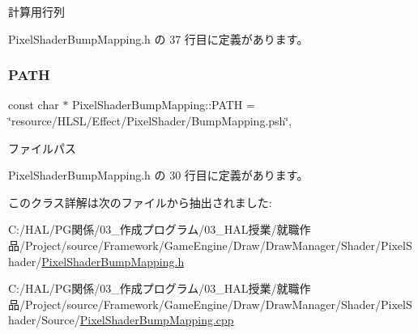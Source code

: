 計算用行列 



 Pixel\+Shader\+Bump\+Mapping.\+h の 37 行目に定義があります。

\mbox{\label{class_pixel_shader_bump_mapping_a62c06006cdfad9bc6158b5d779aa732c}} 
\subsubsection{\texorpdfstring{P\+A\+TH}{PATH}}
{\footnotesize\ttfamily const char $\ast$ Pixel\+Shader\+Bump\+Mapping\+::\+P\+A\+TH = \char`\"{}resource/H\+L\+SL/Effect/Pixel\+Shader/Bump\+Mapping.\+psh\char`\"{}\hspace{0.3cm}{\ttfamily [static]}, {\ttfamily [private]}}



ファイルパス 



 Pixel\+Shader\+Bump\+Mapping.\+h の 30 行目に定義があります。



このクラス詳解は次のファイルから抽出されました\+:\begin{DoxyCompactItemize}
\item 
C\+:/\+H\+A\+L/\+P\+G関係/03\+\_\+作成プログラム/03\+\_\+\+H\+A\+L授業/就職作品/\+Project/source/\+Framework/\+Game\+Engine/\+Draw/\+Draw\+Manager/\+Shader/\+Pixel\+Shader/\mbox{\hyperlink{_pixel_shader_bump_mapping_8h}{Pixel\+Shader\+Bump\+Mapping.\+h}}\item 
C\+:/\+H\+A\+L/\+P\+G関係/03\+\_\+作成プログラム/03\+\_\+\+H\+A\+L授業/就職作品/\+Project/source/\+Framework/\+Game\+Engine/\+Draw/\+Draw\+Manager/\+Shader/\+Pixel\+Shader/\+Source/\mbox{\hyperlink{_pixel_shader_bump_mapping_8cpp}{Pixel\+Shader\+Bump\+Mapping.\+cpp}}\end{DoxyCompactItemize}
